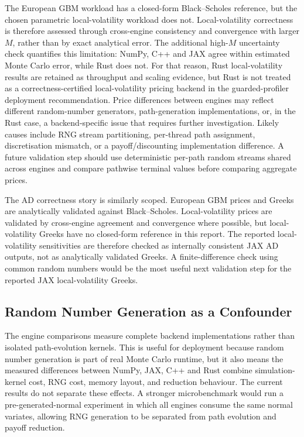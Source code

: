 The European GBM workload has a closed-form Black--Scholes reference, but
the chosen parametric local-volatility workload does not.  Local-volatility
correctness is therefore assessed through cross-engine consistency and
convergence with larger \(M\), rather than by exact analytical error.  The
additional high-\(M\) uncertainty check quantifies this limitation: NumPy, C++
and JAX agree within estimated Monte Carlo error, while Rust does not. For that
reason, Rust local-volatility results are retained as throughput and scaling
evidence, but Rust is not treated as a correctness-certified local-volatility
pricing backend in the guarded-profiler deployment recommendation. Price
differences between engines may reflect different random-number generators,
path-generation implementations, or, in the Rust case, a backend-specific
issue that requires further investigation. Likely causes include RNG stream
partitioning, per-thread path assignment, discretisation mismatch, or a
payoff/discounting implementation difference. A future validation step should
use deterministic per-path random streams shared across engines and compare
pathwise terminal values before comparing aggregate prices.

The AD correctness story is similarly scoped. European GBM prices and Greeks
are analytically validated against Black--Scholes. Local-volatility prices are
validated by cross-engine agreement and convergence where possible, but
local-volatility Greeks have no closed-form reference in this report. The
reported local-volatility sensitivities are therefore checked as internally
consistent JAX AD outputs, not as analytically validated Greeks. A finite-difference check using common random numbers would be the most useful
next validation step for the reported JAX local-volatility Greeks.

\subsection{Random Number Generation as a Confounder}
\label{subsec:limitations-rng}

The engine comparisons measure complete backend implementations rather than
isolated path-evolution kernels. This is useful for deployment because random
number generation is part of real Monte Carlo runtime, but it also means the
measured differences between NumPy, JAX, C++ and Rust combine simulation-kernel
cost, RNG cost, memory layout, and reduction behaviour. The current results do
not separate these effects. A stronger microbenchmark would run a
pre-generated-normal experiment in which all engines consume the same normal
variates, allowing RNG generation to be separated from path evolution and
payoff reduction.

